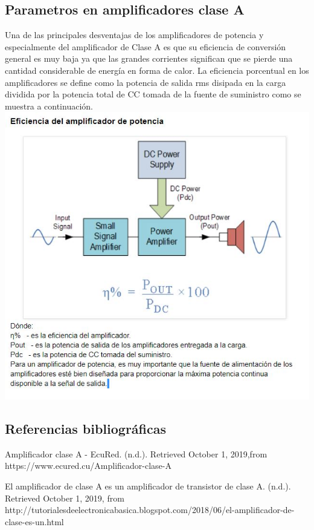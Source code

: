 \documentclass[12pt,a4paper]{article}
\begin{document}
\begin{center}
\section{Parametros en amplificadores clase A}
\end{center}
\begin{flushleft}
Una de las principales desventajas de los amplificadores de potencia y especialmente del amplificador de Clase A es que su eficiencia de conversión general es muy baja ya que las grandes corrientes significan que se pierde una cantidad considerable de energía en forma de calor. La eficiencia porcentual en los amplificadores se define como la potencia de salida rms disipada en la carga dividida por la potencia total de CC tomada de la fuente de suministro como se muestra a continuación.\linebreak
\includegraphics[scale=1]{imagenes/parametros.JPG} 
\newpage

\subsection{Referencias bibliográficas}

Amplificador clase A - EcuRed. (n.d.). Retrieved October 1, 2019,from https://www.ecured.cu/Amplificador-clase-A\linebreak

El amplificador de clase A es un amplificador de transistor de clase A. (n.d.). Retrieved October 1, 2019, from http://tutorialesdeelectronicabasica.blogspot.com/2018/06/el-amplificador-de-clase-es-un.html
\end{flushleft}
\end{document}
